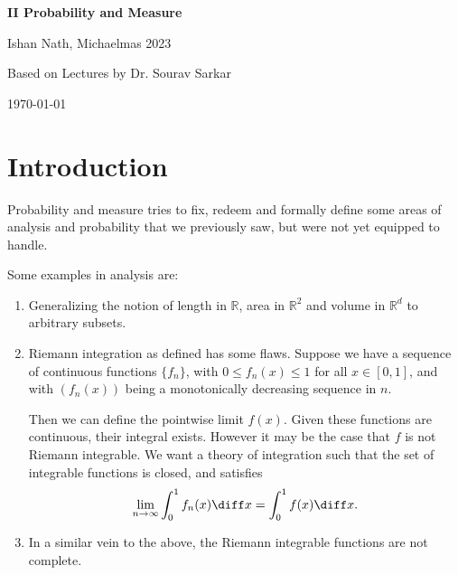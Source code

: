 \documentclass[12pt]{article}
\begin{document}
\hypersetup{pageanchor=false}
\begin{titlepage}
	\begin{center}
		\vspace*{1em}
		\Huge
		\textbf{II Probability and Measure}

		\vspace{1em}
		\large
		Ishan Nath, Michaelmas 2023

		\vspace{1.5em}

		\Large

		Based on Lectures by Dr. Sourav Sarkar

		\vspace{1em}

		\large
		\today
	\end{center}
	
\end{titlepage}
\hypersetup{pageanchor=true}

\tableofcontents

\newpage


\section{Introduction}
\label{sec:intro}

Probability and measure tries to fix, redeem and formally define some areas of analysis and probability that we previously saw, but were not yet equipped to handle.

Some examples in analysis are:
\begin{enumerate}
	\item Generalizing the notion of length in $\mathbb{R}$, area in $\mathbb{R}^2$ and volume in $\mathbb{R}^{d}$ to arbitrary subsets.
	\item Riemann integration as defined has some flaws. Suppose we have a sequence of continuous functions $\{f_n\}$, with $0 \leq f_n(x) \leq 1$ for all $x \in [0, 1]$, and with $(f_n(x))$ being a monotonically decreasing sequence in $n$.

		Then we can define the pointwise limit $f(x)$. Given these functions are continuous, their integral exists. However it may be the case that $f$ is not Riemann integrable. We want a theory of integration such that the set of integrable functions is closed, and satisfies
		\[
		\lim_{n \to \infty} \int_0^1 f_n(x) \diff x = \int_0^1 f(x) \diff x.
		\]
	\item In a similar vein to the above, the Riemann integrable functions are not complete.
\end{enumerate}
\end{document}
